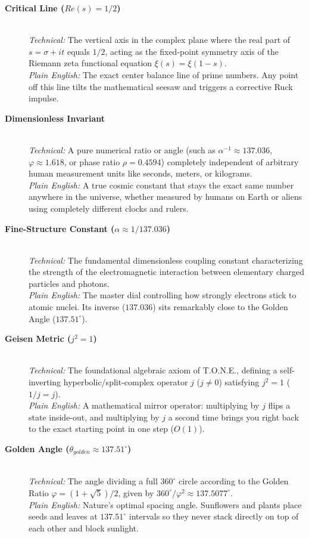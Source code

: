 \documentclass[11pt,a4paper,oneside]{article}
\def\text#1{#1}%
\theoremstyle{definition}
\begin{document}
\begin{description}
    \item[\textbf{Critical Line ($\text{Re}(s) = 1/2$)}] \hfill \\
    \textit{Technical:} The vertical axis in the complex plane where the real part of $s = \sigma + it$ equals $1/2$, acting as the fixed-point symmetry axis of the Riemann zeta functional equation $\xi(s) = \xi(1-s)$. \\
    \textit{Plain English:} The exact center balance line of prime numbers. Any point off this line tilts the mathematical seesaw and triggers a corrective Ruck impulse.

    \item[\textbf{Dimensionless Invariant}] \hfill \\
    \textit{Technical:} A pure numerical ratio or angle (such as $\alpha^{-1} \approx 137.036$, $\varphi \approx 1.618$, or phase ratio $\rho = 0.4594$) completely independent of arbitrary human measurement units like seconds, meters, or kilograms. \\
    \textit{Plain English:} A true cosmic constant that stays the exact same number anywhere in the universe, whether measured by humans on Earth or aliens using completely different clocks and rulers.

    \item[\textbf{Fine-Structure Constant ($\alpha \approx 1/137.036$)}] \hfill \\
    \textit{Technical:} The fundamental dimensionless coupling constant characterizing the strength of the electromagnetic interaction between elementary charged particles and photons. \\
    \textit{Plain English:} The master dial controlling how strongly electrons stick to atomic nuclei. Its inverse ($137.036$) sits remarkably close to the Golden Angle ($137.51^\circ$).

    \item[\textbf{Geisen Metric ($j^2 = 1$)}] \hfill \\
    \textit{Technical:} The foundational algebraic axiom of T.O.N.E., defining a self-inverting hyperbolic/split-complex operator $j$ ($j \neq 0$) satisfying $j^2 = 1$ ($1/j = j$). \\
    \textit{Plain English:} A mathematical mirror operator: multiplying by $j$ flips a state inside-out, and multiplying by $j$ a second time brings you right back to the exact starting point in one step ($O(1)$).

    \item[\textbf{Golden Angle ($\theta_{\text{golden}} \approx 137.51^\circ$)}] \hfill \\
    \textit{Technical:} The angle dividing a full $360^\circ$ circle according to the Golden Ratio $\varphi = (1+\sqrt{5})/2$, given by $360^\circ / \varphi^2 \approx 137.5077^\circ$. \\
    \textit{Plain English:} Nature's optimal spacing angle. Sunflowers and plants place seeds and leaves at $137.51^\circ$ intervals so they never stack directly on top of each other and block sunlight.


\end{description}
\end{document}
